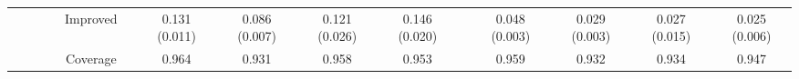 \documentclass[12pt]{article}
\newcommand{\btheta}{\boldsymbol \theta}
\newcommand{\0}{{\bf 0}}
\begin{document}
\begin{table}[tbp]
\begin{center}
{\begin{tabular}{ccccccccccccccc}
                                           &  &                      &  & Improved          &  & 0.131 (0.011) & 0.086 (0.007) & 0.121 (0.026) & 0.146 (0.020)  &  & 0.048 (0.003) & 0.029 (0.003) & 0.027 (0.015) & 0.025 (0.006) \\
                                           &  &                      &  & Coverage          &  & 0.964         & 0.931         & 0.958         & 0.953         &  & 0.959         & 0.932         & 0.934         & 0.947  \\ \hline     
\end{tabular}
}

	\end{center}
	 \vspace{-0.5cm}
\end{table}

\end{document}
